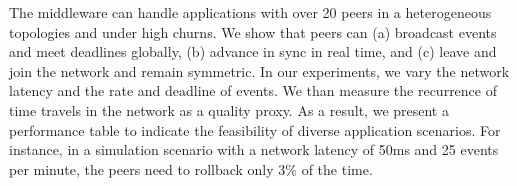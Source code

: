 \documentclass[12pt]{article}
\begin{document}
The middleware can handle applications with over 20 peers in a heterogeneous
topologies and under high churns.
%
We show that peers can
    (a) broadcast events and meet deadlines globally, 
    (b) advance in sync in real time, and
    (c) leave and join the network and remain symmetric.
%
In our experiments, we vary the network latency and the rate and deadline of
events.
We than measure the recurrence of time travels in the network as a quality
proxy.
%
As a result, we present a performance table to indicate the feasibility of
diverse application scenarios.
For instance, in a simulation scenario with a network latency of 50ms and 25
events per minute, the peers need to rollback only 3\% of the time.



\end{document}
